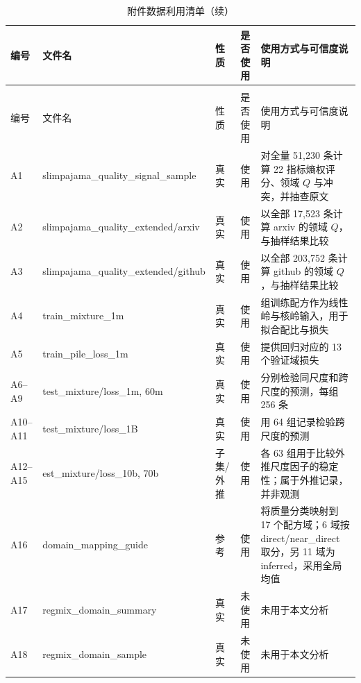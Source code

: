 \begin{longtable}{@{}>{\centering\arraybackslash}p{}>{\raggedright\arraybackslash}p{}>{\centering\arraybackslash}p{}>{\centering\arraybackslash}p{}>{\raggedright\arraybackslash}p{}@{}}
  \caption{附件数据利用清单}
  \label{tab:appendix} \\
  \toprule
  编号 & 文件名 & 性质 & 是否使用 & 使用方式与可信度说明 \\
  \midrule
  \endfirsthead
  \caption{附件数据利用清单（续）} \\
  \toprule
  编号 & 文件名 & 性质 & 是否使用 & 使用方式与可信度说明 \\
  \midrule
  \endhead
  \bottomrule
  \endfoot
  A1 & slimpajama\_\allowbreak{}quality\_\allowbreak{}signal\_\allowbreak{}sample & 真实 & 使用 & 对全量 51{,}230 条计算 22 指标熵权评分、领域 $Q$ 与冲突，并抽查原文 \\
  A2 & slimpajama\_\allowbreak{}quality\_\allowbreak{}extended/arxiv & 真实 & 使用 & 以全部 17{,}523 条计算 arxiv 的领域 $Q$，与抽样结果比较 \\
  A3 & slimpajama\_\allowbreak{}quality\_\allowbreak{}extended/github & 真实 & 使用 & 以全部 203{,}752 条计算 github 的领域 $Q$，与抽样结果比较 \\
  A4 & train\_\allowbreak{}mixture\_\allowbreak{}1m & 真实 & 使用 & 512 组训练配方作为线性岭与核岭输入，用于拟合配比与损失 \\
  A5 & train\_\allowbreak{}pile\_\allowbreak{}loss\_\allowbreak{}1m & 真实 & 使用 & 提供回归对应的 13 个验证域损失 \\
  A6--A9 & test\_\allowbreak{}mixture/loss\_\allowbreak{}1m, 60m & 真实 & 使用 & 分别检验同尺度和跨尺度的预测，每组 256 条 \\
  A10--A11 & test\_\allowbreak{}mixture/loss\_\allowbreak{}1B & 真实 & 使用 & 用 64 组记录检验跨尺度的预测 \\
  A12--A15 & est\_\allowbreak{}mixture/loss\_\allowbreak{}10b, 70b & 子集/外推 & 使用 & 各 63 组用于比较外推尺度因子的稳定性；属于外推记录，并非观测 \\
  A16 & domain\_\allowbreak{}mapping\_\allowbreak{}guide & 参考 & 使用 & 将质量分类映射到 17 个配方域；6 域按 direct/near\_\allowbreak{}direct 取分，另 11 域为 inferred，采用全局均值 \\
  A17 & regmix\_\allowbreak{}domain\_\allowbreak{}summary & 真实 & 未使用 & 未用于本文分析 \\
  A18 & regmix\_\allowbreak{}domain\_\allowbreak{}sample & 真实 & 未使用 & 未用于本文分析 \\

\end{longtable}
